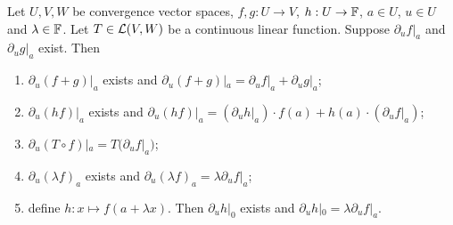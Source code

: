 \begin{proposition} \label{directionalDerivativeConstructions}
Let $U,V,W$ be convergence vector spaces, $f,g: U\to V$, $h: U\to \mathbb{F}$, $a\in U$, $u\in U$ and $\lambda\in\mathbb{F}$. Let $T\in \operatorname{\mathcal{L}}(V,W)$ be a continuous linear function. Suppose $\partial_uf|_a$ and $\partial_u g|_a$ exist. Then
\begin{enumerate}
\item $\partial_u(f+g)|_a$ exists and $\partial_u(f+g)|_a = \partial_uf|_a + \partial_u g|_a$;
\item $\partial_u(hf)|_a$ exists and $\partial_u(hf)|_a = (\partial_uh|_a)\cdot f(a) + h(a)\cdot(\partial_u f|_a)$;
\item $\partial_u(T\circ f)|_a = T\big(\partial_uf|_a\big)$;
\item $\partial_u(\lambda f)_a$ exists and $\partial_u(\lambda f)_a = \lambda \partial_uf|_a$;
\item define $h: x\mapsto f(a+\lambda x)$. Then $\partial_u h|_0$ exists and $\partial_uh|_0 = \lambda \partial_u f|_a$.
\end{enumerate}
\end{proposition}
